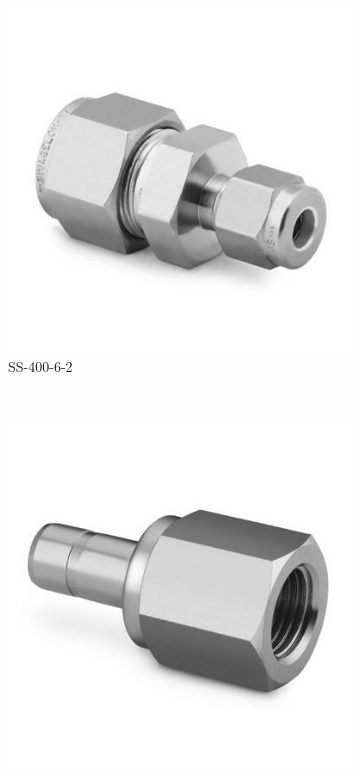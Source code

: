 \begin{figure}[H]
    \centering
    \begin{subfigure}[b]{0.21\textwidth}
    \centering
    \includegraphics[width=\textwidth]{appendix/img/interfaces/SS-400-6-2.jpg}
    \caption{SS-400-6-2}
    \end{subfigure}
    ~
    \begin{subfigure}[b]{0.21\textwidth}
    \centering
    \includegraphics[width=\textwidth]{appendix/img/interfaces/SS-4-TA-7-4RG.jpg}

\end{subfigure}
\end{figure}
